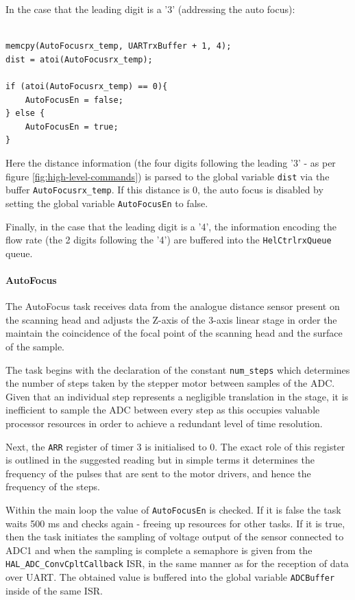 In the case that the leading digit is a '3' (addressing the auto focus):

\begin{listing}
\begin{verbatim}

memcpy(AutoFocusrx_temp, UARTrxBuffer + 1, 4);
dist = atoi(AutoFocusrx_temp);

if (atoi(AutoFocusrx_temp) == 0){
	AutoFocusEn = false;
} else {
    AutoFocusEn = true;
}

\end{verbatim}
\label{listing:3}
\end{listing}

Here the distance information (the four digits following the leading '3' - as per figure \ref{fig:high-level-commands}) is parsed to the global variable \verb|dist| via the buffer \verb|AutoFocusrx_temp|. If this distance is 0, the auto focus is disabled by setting the global variable \verb|AutoFocusEn| to false.

Finally, in the case that the leading digit is a '4', the information encoding the flow rate (the 2 digits following the '4') are buffered into the \verb|HelCtrlrxQueue| queue.

\paragraph{AutoFocus}

The AutoFocus task receives data from the analogue distance sensor present on the scanning head and adjusts the Z-axis of the 3-axis linear stage in order the maintain the coincidence of the focal point of the scanning head and the surface of the sample.

The task begins with the declaration of the constant \verb|num_steps| which determines the number of steps taken by the stepper motor between samples of the ADC. Given that an individual step represents a negligible translation in the stage, it is inefficient to sample the ADC between every step as this occupies valuable processor resources in order to achieve a redundant level of time resolution.

Next, the \verb|ARR| register of timer 3 is initialised to 0. The exact role of this register is outlined in the suggested reading but in simple terms it determines the frequency of the pulses that are sent to the motor drivers, and hence the frequency of the steps.

Within the main loop the value of \verb|AutoFocusEn| is checked. If it is false the task waits 500 ms and checks again - freeing up resources for other tasks. If it is true, then the task initiates the sampling of voltage output of the sensor connected to ADC1 and when the sampling is complete a semaphore is given from the \verb|HAL_ADC_ConvCpltCallback| ISR, in the same manner as for the reception of data over UART. The obtained value is buffered into the global variable \verb|ADCBuffer| inside of the same ISR.

